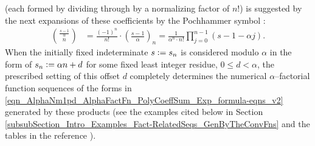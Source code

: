 \documentclass[12pt,reqno]{article}
\numberwithin{sfootnote}{section}
\numberwithin{equation}{section}
\theoremstyle{plain}
\theoremstyle{definition}
\theoremstyle{remark}
\newcommand{\cf}[0]{cf.\ }
\newcommand{\defequals}{\ensuremath{\vcentcolon=}}
\newcommand{\Pochhammer}[2]{\ensuremath{\left(#1\right)_{#2}}}
\begin{document}
(each formed by dividing through by a normalizing factor of $n!$) 
is suggested by the next expansions of these coefficients by 
the Pochhammer symbol \citep[\S 5]{GKP}: 
\begin{align} 
\label{eqn_BinomCoeff_AlphaNm1pd_AlphaFactFn_Exp_formula-v2} 
\binom{\frac{s-1}{\alpha}}{n} & = 
     \frac{(-1)^{n}}{n!} \cdot \Pochhammer{\frac{s-1}{\alpha}}{n} = 
     \frac{1}{\alpha^{n} \cdot n!} \prod_{j=0}^{n-1} \left( 
     s - 1 -\alpha j 
     \right). 
\end{align} 
When the initially fixed indeterminate $s \defequals s_n$ 
is considered modulo $\alpha$ in the form of 
$s_n \defequals \alpha n + d$ for some fixed least integer residue, 
$0 \leq d < \alpha$, the 
prescribed setting of this offset $d$ completely determines the 
numerical $\alpha$--factorial function sequences of the forms in 
\eqref{eqn_AlphaNm1pd_AlphaFactFn_PolyCoeffSum_Exp_formula-eqns_v2} 
generated by these products 
(see the examples cited below in 
Section \ref{subsubSection_Intro_Examples_Fact-RelatedSeqs_GenByTheConvFns} 
and the tables in the reference 
\citep[\cf \S 6.1.2, Table 6.1]{MULTIFACTJIS}). 
\end{document}
